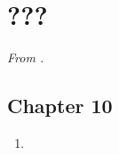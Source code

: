\documentclass[../psets.tex]{subfiles}
\begin{document}
\section{???}
\emph{From \textcite{bib:Rudin}.}
\subsection*{Chapter 10}
\begin{enumerate}[label={\textbf{\arabic*.}}]
    \item 
\end{enumerate}
\end{document}
